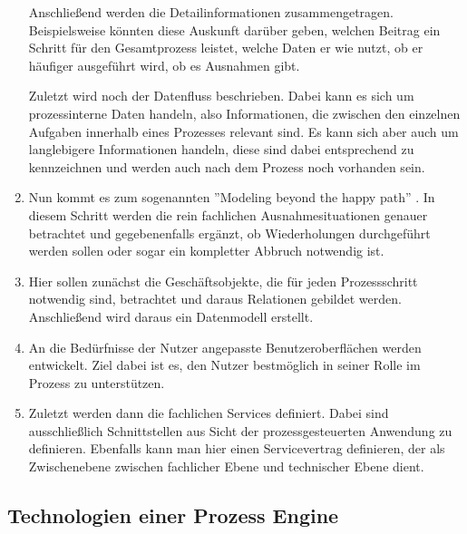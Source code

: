 \begin{enumerate}
    Anschließend werden die Detailinformationen zusammengetragen. Beispielsweise könnten diese Auskunft darüber geben, welchen Beitrag ein Schritt für den Gesamtprozess leistet, welche Daten er wie nutzt, ob er häufiger ausgeführt wird, ob es Ausnahmen gibt. \cite[vgl.][S. 66f]{stiehl_prozessgesteuerte_2013} 
    
    Zuletzt wird noch der Datenfluss beschrieben. Dabei kann es sich um prozessinterne Daten handeln, also Informationen, die zwischen den einzelnen Aufgaben innerhalb eines Prozesses relevant sind. Es kann sich aber auch um langlebigere Informationen handeln, diese sind dabei entsprechend zu kennzeichnen und werden auch nach dem Prozess noch vorhanden sein. \citep[vgl.][S. 67]{stiehl_prozessgesteuerte_2013}
    
    \item Nun kommt es zum sogenannten ''Modeling beyond the happy path'' \citep{camunda_services_gmbh_modeling_2024}. In diesem Schritt werden die rein fachlichen Ausnahmesituationen genauer betrachtet und gegebenenfalls ergänzt, ob Wiederholungen durchgeführt werden sollen oder sogar ein kompletter Abbruch notwendig ist. \citep[vgl.][S. 67]{stiehl_prozessgesteuerte_2013}
    
    \item Hier sollen zunächst die Geschäftsobjekte, die für jeden Prozessschritt notwendig sind, betrachtet und daraus Relationen gebildet werden. Anschließend wird daraus ein Datenmodell erstellt. \citep[vgl.][S. 69f]{stiehl_prozessgesteuerte_2013}
    
    \item An die Bedürfnisse der Nutzer angepasste Benutzeroberflächen werden entwickelt. Ziel dabei ist es, den Nutzer bestmöglich in seiner Rolle im Prozess zu unterstützen. \citep[vgl.][S. 70f]{stiehl_prozessgesteuerte_2013}
    
    \item Zuletzt werden dann die fachlichen Services definiert. Dabei sind ausschließlich Schnittstellen aus Sicht der prozessgesteuerten Anwendung zu definieren. Ebenfalls kann man hier einen Servicevertrag definieren, der als Zwischenebene zwischen fachlicher Ebene und technischer Ebene dient. \citep[vgl.][S. 72f]{stiehl_prozessgesteuerte_2013}
\end{enumerate}

\clearpage
\subsection{Technologien einer Prozess Engine}
